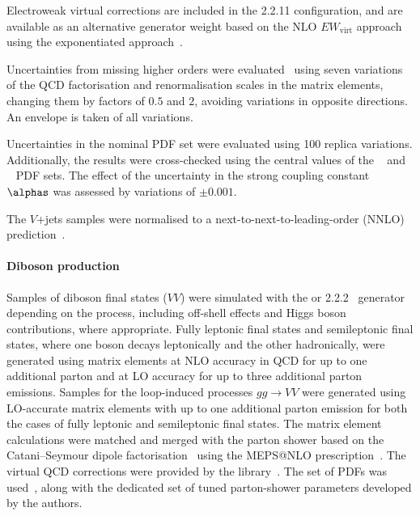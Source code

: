 Electroweak virtual corrections are included in the 2.2.11 configuration,
and are available as an alternative generator weight based on the
NLO \(EW_\mathrm{virt}\) approach using the exponentiated
approach~\cite{Kallweit:2014xda,Kallweit:2015dum}.

Uncertainties from missing higher orders were
evaluated~\cite{Bothmann:2016nao} using seven variations of the QCD
factorisation and renormalisation scales in the matrix elements, changing them by
factors of \(0.5\) and \(2\), avoiding variations in opposite directions.
An envelope is taken of all variations.

Uncertainties in the nominal PDF set were evaluated using 100 replica
variations. Additionally, the results were cross-checked using the
central values of the \CT[14nnlo]~\cite{Dulat:2015mca} and
\MMHT[nnlo]~\cite{Harland-Lang:2014zoa} PDF sets. The effect of the uncertainty
in the strong coupling constant \( \alphas \) was assessed by variations
of \(\pm 0.001\).

The \(V\)+jets samples were normalised to a next-to-next-to-leading-order (NNLO)
prediction~\cite{Anastasiou:2003ds}.


\paragraph*{Diboson production}

Samples of diboson final states (\(VV\)) were simulated with the
\SHERPA[2.2.1] or 2.2.2~\cite{Bothmann:2019yzt} generator depending on the process,
including off-shell effects and Higgs boson contributions, where appropriate.
Fully leptonic final states and semileptonic final states, where one boson
decays leptonically and the other hadronically, were generated using
matrix elements at NLO accuracy in QCD for up to one additional parton
and at LO accuracy for up to three additional parton
emissions. Samples for the loop-induced processes \(gg \to VV\) were
generated using LO-accurate matrix elements with up to one
additional parton emission for both the cases of fully leptonic and
semileptonic final states. The matrix element calculations were matched
and merged with the \SHERPA parton shower based on the Catani--Seymour  %
dipole factorisation~\cite{Gleisberg:2008fv,Schumann:2007mg} using the MEPS@NLO
prescription~\cite{Hoeche:2011fd,Hoeche:2012yf,Catani:2001cc,Hoeche:2009rj}.
The virtual QCD corrections were provided by the
\OPENLOOPS library~\cite{Buccioni:2019sur,Cascioli:2011va,Denner:2016kdg}. The
\NNPDF[3.0nnlo] set of PDFs was used~\cite{Ball:2014uwa}, along with the
dedicated set of tuned parton-shower parameters developed by the
\SHERPA authors.

